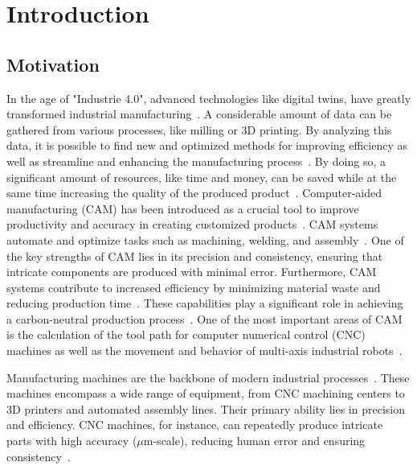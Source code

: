 \chapter{Introduction}%
\section{Motivation}%

In the age of "Industrie 4.0", advanced technologies like digital twins, have greatly transformed industrial manufacturing~\cite{Singh.2021}. A considerable amount of data can be gathered from various processes, like milling or 3D printing. By analyzing this data, it is possible to find new and optimized methods for improving efficiency as well as streamline and enhancing the manufacturing process~\cite{Ghobakhloo.2020}. By doing so, a significant amount of resources, like time and money, can be saved while at the same time increasing the quality of the produced product~\cite{Bibby.2018,Simonis.2016}.
Computer-aided manufacturing (\acrshort{CAM}) has been introduced as a crucial tool to improve productivity and accuracy in creating customized products~\cite{Feldhausen.2022}. \acrshort{CAM} systems automate and optimize tasks such as machining, welding, and assembly~\cite{LalitNarayan.2013b}. One of the key strengths of \acrshort{CAM} lies in its precision and consistency, ensuring that intricate components are produced with minimal error. Furthermore, \acrshort{CAM} systems contribute to increased efficiency by minimizing material waste and reducing production time~\cite{Dubovska.2014}. These capabilities play a significant role in achieving a carbon-neutral production process~\cite{Saxena.2020}. One of the most important areas of \acrshort{CAM} is the calculation of the tool path for computer numerical control (\acrshort{CNC}) machines as well as the movement and behavior of multi-axis industrial robots~\cite{Pan}. 


Manufacturing machines are the backbone of modern industrial processes~\cite{Bi.2020}. These machines encompass a wide range of equipment, from \acrshort{CNC} machining centers to 3D printers and automated assembly lines. Their primary ability lies in precision  and efficiency. \acrshort{CNC} machines, for instance, can repeatedly produce intricate parts with high accuracy ($\mu$m-scale), reducing human error and ensuring consistency~\cite{Jia.2018,Liberman.2021}. 

